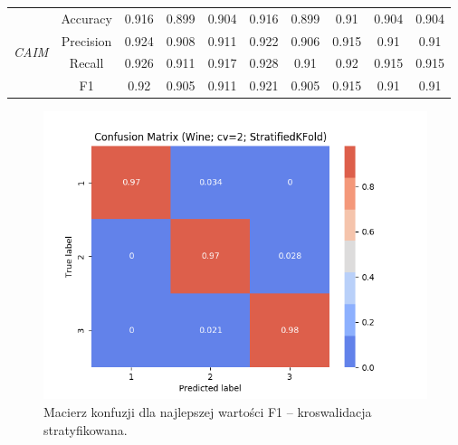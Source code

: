 \begin{table}[H]
\begin{tabular}{|c|c|c|c|c|c|c|c|c|c|}
        \multirow{4}{*}{\textit{CAIM}}  & Accuracy & 0.916 & 0.899 & 0.904 & 0.916 & 0.899 & 0.91 & 0.904 & 0.904 \\ \cline{2-10}
                                         & Precision & 0.924 & 0.908 & 0.911 & 0.922 & 0.906 & 0.915 & 0.91 & 0.91 \\ \cline{2-10}
                                         & Recall & 0.926 & 0.911 & 0.917 & 0.928 & 0.91 & 0.92 & 0.915 & 0.915 \\ \cline{2-10}
                                         & F1 & 0.92 & 0.905 & 0.911 & 0.921 & 0.905 & 0.915 & 0.91 & 0.91 \\ \cline{2-10}

            \hline
    \end{tabular}
\end{table}

\begin{figure}[H]
    \includegraphics[width=\textwidth]{img/conf_matrices/cm_Wine_cv2_StratifiedKFold.png}
    \caption{Macierz konfuzji dla najlepszej wartości F1 -- kroswalidacja stratyfikowana.}
\end{figure}